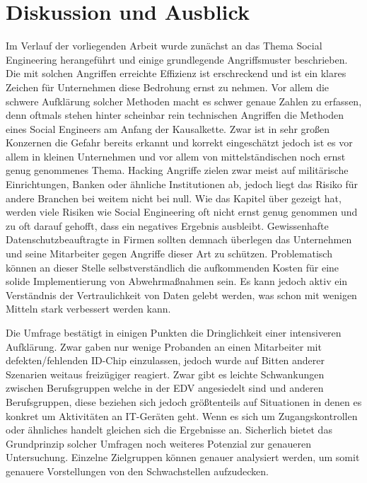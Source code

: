\section{Diskussion und Ausblick}\label{diskussion-und-ausblick}

Im Verlauf der vorliegenden Arbeit wurde zunächst an das Thema Social Engineering herangeführt und einige grundlegende Angriffsmuster beschrieben.
Die mit solchen Angriffen erreichte Effizienz ist erschreckend und ist ein klares Zeichen für Unternehmen diese Bedrohung ernst zu nehmen.
Vor allem die schwere Aufklärung solcher Methoden macht es schwer genaue Zahlen zu erfassen, denn oftmals stehen hinter scheinbar rein technischen Angriffen die Methoden eines Social Engineers am Anfang der Kausalkette.
Zwar ist in sehr großen Konzernen die Gefahr bereits erkannt und korrekt eingeschätzt jedoch ist es vor allem in kleinen Unternehmen und vor allem von mittelständischen noch ernst genug genommenes Thema.
Hacking Angriffe zielen zwar meist auf militärische Einrichtungen, Banken oder ähnliche Institutionen ab, jedoch liegt das Risiko für andere Branchen bei weitem nicht bei null.
Wie das Kapitel über  gezeigt hat, werden viele Risiken wie Social Engineering oft nicht ernst genug genommen und zu oft darauf gehofft, dass ein negatives Ergebnis ausbleibt.
Gewissenhafte Datenschutzbeauftragte in Firmen sollten demnach überlegen das Unternehmen und seine Mitarbeiter gegen Angriffe dieser Art zu schützen.
Problematisch können an dieser Stelle selbstverständlich die aufkommenden Kosten für eine solide Implementierung von Abwehrmaßnahmen sein.
Es kann jedoch aktiv ein Verständnis der Vertraulichkeit von Daten gelebt werden, was schon mit wenigen Mitteln stark verbessert werden kann.

Die Umfrage bestätigt in einigen Punkten die Dringlichkeit einer intensiveren Aufklärung.
Zwar gaben nur wenige Probanden an einen Mitarbeiter mit defekten/fehlenden ID-Chip einzulassen, jedoch wurde auf Bitten anderer Szenarien weitaus freizügiger reagiert.
Zwar gibt es leichte Schwankungen zwischen Berufsgruppen welche in der EDV angesiedelt sind und anderen Berufsgruppen, diese beziehen sich jedoch größtenteils auf Situationen in denen es konkret um Aktivitäten an IT-Geräten geht.
Wenn es sich um Zugangskontrollen oder ähnliches handelt gleichen sich die Ergebnisse an.
Sicherlich bietet das Grundprinzip solcher Umfragen noch weiteres Potenzial zur genaueren Untersuchung.
Einzelne Zielgruppen können genauer analysiert werden, um somit genauere Vorstellungen von den Schwachstellen aufzudecken.

